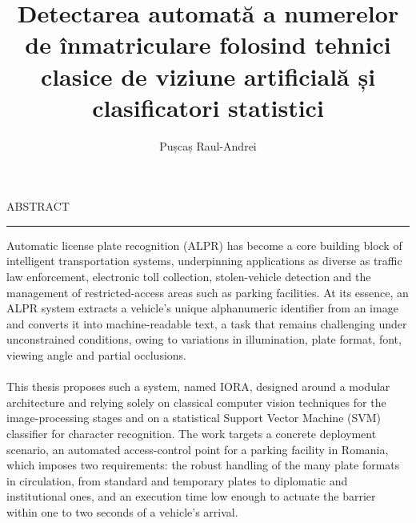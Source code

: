 \documentclass[12pt]{report}
\begin{document}
\title{Detectarea automată a numerelor de înmatriculare folosind tehnici clasice de viziune artificială și clasificatori statistici}
\author{Pușcaș Raul-Andrei}
				
\maketitle


\newpage
\thispagestyle{empty}
\mbox{}
\newpage
{} 

\cleardoublepage
ABSTRACT
\vspace{0.5cm}	
\hrule
\vspace{0.5cm}	






Automatic license plate recognition (ALPR) has become a core building block of intelligent
transportation systems, underpinning applications as diverse as traffic law enforcement,
electronic toll collection, stolen-vehicle detection and the management of restricted-access
areas such as parking facilities. At its essence, an ALPR system extracts a vehicle's unique
alphanumeric identifier from an image and converts it into machine-readable text, a task
that remains challenging under unconstrained conditions, owing to variations in illumination,
plate format, font, viewing angle and partial occlusions.
\paragraph{}
This thesis proposes such a system, named IORA, designed around a modular architecture and
relying solely on classical computer vision techniques for the image-processing stages and on
a statistical Support Vector Machine (SVM) classifier for character recognition. The work
targets a concrete deployment scenario, an automated access-control point for a parking
facility in Romania, which imposes two requirements: the robust handling of the many plate
formats in circulation, from standard and temporary plates to diplomatic and institutional
ones, and an execution time low enough to actuate the barrier within one to two seconds of a
vehicle's arrival.
\end{document}
